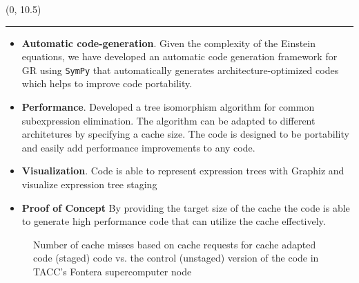 \documentclass[landscape]{a0poster}
\def\Subhead#1{\noindent{\textbf{\Large\color{DarkBlue} #1}}\medskip}
\begin{document}
	\begin{textblock}{14}(0, 10.5)
		{\color{DarkBlue}\hrule}\medskip
		\Subhead{Contributions}
		\vspace{-0.2in}
		\begin{itemize}
			\item \textbf{Automatic code-generation}. Given the complexity of the Einstein equations, we have developed an automatic code generation framework for GR using \texttt{SymPy} that automatically generates architecture-optimized codes which helps to improve code portability. 
			\item \textbf{Performance}. Developed a tree isomorphism algorithm for common subexpression elimination. The algorithm can be adapted to different architetures by specifying a cache size. The code is designed to be portability and easily add performance improvements to any code.
			\item \textbf{Visualization}. 
			Code is able to represent expression trees with Graphiz and visualize expression tree staging	
			\item \textbf{Proof of Concept} 
			By providing the target size of the cache the code is able to generate high performance code that can utilize the cache effectively.
			
			
		
		\end{itemize}
		\begin{figure}
		\centering
		\caption{Number of cache misses based on cache requests for cache adapted code (staged) code vs. the control (unstaged) version of the code in TACC's Fontera supercomputer node }
		\label{fig:cache_results}
		\end{figure}
		
	\end{textblock}
	
\end{document}
